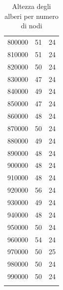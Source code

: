 \documentclass{article}
\begin{document}
\begin{longtable}{c|c|c}
           800000 &            51 &            24 \\
           810000 &            51 &            24 \\
           820000 &            50 &            24 \\
           830000 &            47 &            24 \\
           840000 &            49 &            24 \\
           850000 &            47 &            24 \\
           860000 &            48 &            24 \\
           870000 &            50 &            24 \\
           880000 &            49 &            24 \\
           890000 &            48 &            24 \\
           900000 &            48 &            24 \\
           910000 &            48 &            24 \\
           920000 &            56 &            24 \\
           930000 &            49 &            24 \\
           940000 &            48 &            24 \\
           950000 &            50 &            24 \\
           960000 &            54 &            24 \\
           970000 &            50 &            25 \\
           980000 &            50 &            24 \\
           990000 &            50 &            24 \\
\hline
\caption{Altezza degli alberi per numero di nodi}
\end{longtable}

\newpage
\end{document}
